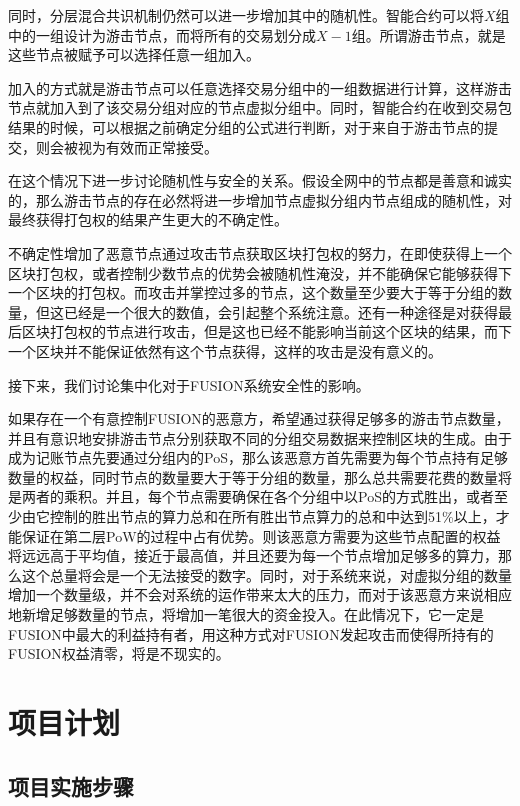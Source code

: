 \documentclass[a4paper,12pt]{article}
\begin{document}
同时，分层混合共识机制仍然可以进一步增加其中的随机性。智能合约可以将$X$组中的一组设计为游击节点，而将所有的交易划分成$X-1$组。所谓游击节点，就是这些节点被赋予可以选择任意一组加入。

加入的方式就是游击节点可以任意选择交易分组中的一组数据进行计算，这样游击节点就加入到了该交易分组对应的节点虚拟分组中。同时，智能合约在收到交易包结果的时候，可以根据之前确定分组的公式进行判断，对于来自于游击节点的提交，则会被视为有效而正常接受。

在这个情况下进一步讨论随机性与安全的关系。假设全网中的节点都是善意和诚实的，那么游击节点的存在必然将进一步增加节点虚拟分组内节点组成的随机性，对最终获得打包权的结果产生更大的不确定性。

不确定性增加了恶意节点通过攻击节点获取区块打包权的努力，在即使获得上一个区块打包权，或者控制少数节点的优势会被随机性淹没，并不能确保它能够获得下一个区块的打包权。而攻击并掌控过多的节点，这个数量至少要大于等于分组的数量，但这已经是一个很大的数值，会引起整个系统注意。还有一种途径是对获得最后区块打包权的节点进行攻击，但是这也已经不能影响当前这个区块的结果，而下一个区块并不能保证依然有这个节点获得，这样的攻击是没有意义的。

接下来，我们讨论集中化对于FUSION系统安全性的影响。

如果存在一个有意控制FUSION的恶意方，希望通过获得足够多的游击节点数量，并且有意识地安排游击节点分别获取不同的分组交易数据来控制区块的生成。由于成为记账节点先要通过分组内的PoS，那么该恶意方首先需要为每个节点持有足够数量的权益，同时节点的数量要大于等于分组的数量，那么总共需要花费的数量将是两者的乘积。并且，每个节点需要确保在各个分组中以PoS的方式胜出，或者至少由它控制的胜出节点的算力总和在所有胜出节点算力的总和中达到51\%以上，才能保证在第二层PoW的过程中占有优势。则该恶意方需要为这些节点配置的权益将远远高于平均值，接近于最高值，并且还要为每一个节点增加足够多的算力，那么这个总量将会是一个无法接受的数字。同时，对于系统来说，对虚拟分组的数量增加一个数量级，并不会对系统的运作带来太大的压力，而对于该恶意方来说相应地新增足够数量的节点，将增加一笔很大的资金投入。在此情况下，它一定是FUSION中最大的利益持有者，用这种方式对FUSION发起攻击而使得所持有的FUSION权益清零，将是不现实的。

\section{项目计划}

\subsection{项目实施步骤}
\end{document}
